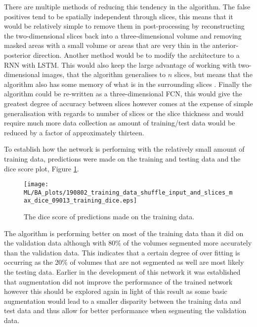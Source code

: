 There are multiple methods of reducing this tendency in the algorithm. The false positives tend to be spatially independent through slices, this means that it would be relatively simple to remove them in post-processing by reconstructing the two-dimensional slices back into a three-dimensional volume and removing masked areas with a small volume or areas that are very thin in the anterior-posterior direction. Another method would be to modify the architecture to a \ac{RNN} with \ac{LSTM}. This would also keep the large advantage of working with two-dimensional images, that the algorithm generalises to $n$ slices, but means that the algorithm also has some memory of what is in the surrounding slices \cite{chen_combining_2016, stollenga_parallel_2015}. Finally the algorithm could be re-written as a three-dimensional \ac{FCN}, this would give the greatest degree of accuracy between slices however comes at the expense of simple generalisation with regards to number of slices or the slice thickness and would require much more data collection as amount of training/test data would be reduced by a factor of approximately thirteen.

To establish how the network is performing with the relatively small amount of training data, predictions were made on the training and testing data and the dice score plot, Figure \ref{fig:ml_training_dice}.

\begin{figure}[H]
	\centering
	\texttt{[image: ML/BA\_plots/190802\_training\_data\_shuffle\_input\_and\_slices\_max\_dice\_09013\_training\_dice.eps]}
	\caption{The dice score of predictions made on the training data.}
	\label{fig:ml_training_dice}
\end{figure}

The algorithm is performing better on most of the training data than it did on the validation data although with 80\% of the volumes segmented more accurately than the validation data. This indicates that a certain degree of over fitting is occurring as the 20\% of volumes that are not segmented as well are most likely the testing data. Earlier in the development of this network it was established that augmentation did not improve the performance of the trained network however this should be explored again in light of this result as some basic augmentation would lead to a smaller disparity between the training data and test data and thus allow for better performance when segmenting the validation data.

